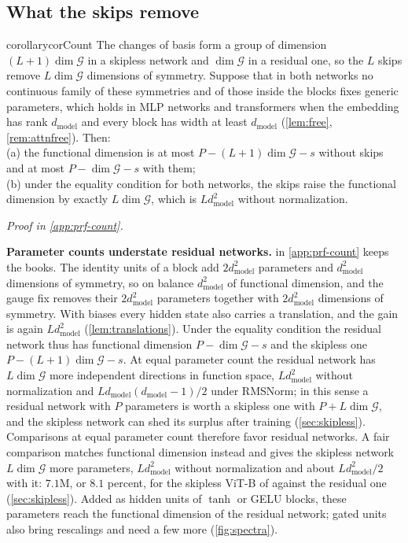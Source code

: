 \documentclass[10pt]{article}
\theoremstyle{definition}
\theoremstyle{remark}
\newcommand{\dm}{d_{\mathrm{model}}}
\newcommand{\G}{\mathcal{G}}
\newcommand{\para}[1]{\smallskip\noindent\textbf{#1}\hspace{0.5em}}
\newcommand{\proofin}[1]{\par\vspace{-0.4\baselineskip}\noindent\hfill{\small\itshape Proof in \cref{#1}.}\par\smallskip}
\begin{document}
\subsection{What the skips remove}\label{sec:count}

\begin{restatable}{corollary}{corCount}\label{cor:count}
The changes of basis form a group of dimension $(L+1)\dim\G$ in a skipless network and $\dim\G$ in a residual one, so the $L$ skips remove $L\dim\G$ dimensions of symmetry. Suppose that in both networks no continuous family of these symmetries and of those inside the blocks fixes generic parameters, which holds in MLP networks and transformers when the embedding has rank $\dm$ and every block has width at least $\dm$ (\cref{lem:free}, \cref{rem:attnfree}). Then:\\
\textup{(a)} the functional dimension is at most $P - (L+1)\dim\G - s$ without skips and at most $P - \dim\G - s$ with them;\\
\textup{(b)} under the equality condition for both networks, the skips raise the functional dimension by exactly $L\dim\G$, which is $L\dm^2$ without normalization.
\end{restatable}
\proofin{app:prf-count}


\para{Parameter counts understate residual networks.}  in \cref{app:prf-count} keeps the books. The identity units of a block add $2\dm^2$ parameters and $\dm^2$ dimensions of symmetry, so on balance $\dm^2$ of functional dimension, and the gauge fix removes their $2\dm^2$ parameters together with $2\dm^2$ dimensions of symmetry. With biases every hidden state also carries a translation, and the gain is again $L\dm^2$ (\cref{lem:translations}). Under the equality condition the residual network thus has functional dimension $P - \dim\G - s$ and the skipless one $P - (L+1)\dim\G - s$. At equal parameter count the residual network has $L\dim\G$ more independent directions in function space, $L\dm^2$ without normalization and $L\dm(\dm-1)/2$ under RMSNorm; in this sense a residual network with $P$ parameters is worth a skipless one with $P + L\dim\G$, and the skipless network can shed its surplus after training (\cref{sec:skipless}). Comparisons at equal parameter count therefore favor residual networks. A fair comparison matches functional dimension instead and gives the skipless network $L\dim\G$ more parameters, $L\dm^2$ without normalization and about $L\dm^2/2$ with it: $7.1$M, or $8.1$ percent, for the skipless ViT-B of \citet{ji2026cutting} against the residual one (\cref{sec:skipless}). Added as hidden units of $\tanh$ or GELU blocks, these parameters reach the functional dimension of the residual network; gated units also bring rescalings and need a few more (\cref{fig:spectra}).
\end{document}

